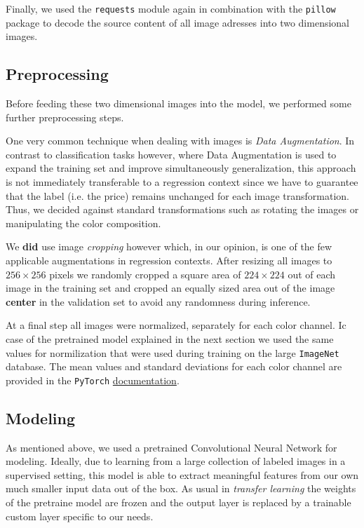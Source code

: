 \documentclass[12pt, letterpaper]{article}
\begin{document}
Finally, we used the \texttt{requests} module again in combination with the \texttt{pillow} package to decode the source content of all image adresses into two dimensional images.


\subsection{Preprocessing}

Before feeding these two dimensional images into the model, we performed some further preprocessing steps.

One very common technique when dealing with images is \emph{Data Augmentation}.
In contrast to classification tasks however, where Data Augmentation is used to expand the training set and improve simultaneously generalization, this approach is not immediately transferable to a regression context since we have to guarantee that the label (i.e. the price) remains unchanged for each image transformation.
Thus, we decided against standard transformations such as rotating the images or manipulating the color composition.

We \textbf{did} use image \emph{cropping} however which, in our opinion, is one of the few applicable augmentations in regression contexts.
After resizing all images to $256 \times 256$ pixels we randomly cropped a square area of $224 \times 224$ out of each image in the training set and cropped an equally sized area out of the image \textbf{center} in the validation set to avoid any randomness during inference.

At a final step all images were normalized, separately for each color channel.
Ic case of the pretrained model explained in the next section we used the same values for normilization that were used during training on the large \texttt{ImageNet} database.
The mean values and standard deviations for each color channel are provided in the \texttt{PyTorch} \href{https://pytorch.org/vision/stable/models.html}{documentation}.


\subsection{Modeling}

As mentioned above, we used a pretrained Convolutional Neural Network for modeling.
Ideally, due to learning from a large collection of labeled images in a supervised setting, this model is able to extract meaningful features from our own much smaller input data out of the box.
As usual in \emph{transfer learning} the weights of the pretraine model are frozen and the output layer is replaced by a trainable custom layer specific to our needs.
\end{document}
